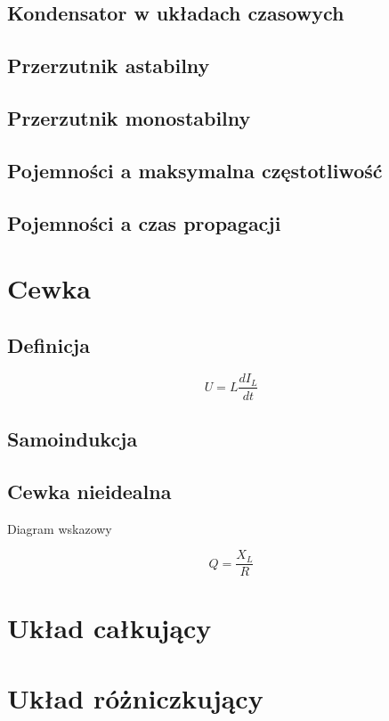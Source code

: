 \documentclass[11pt]{article}
\begin{document}
\subsection{Kondensator w układach czasowych} 

\subsection{Przerzutnik astabilny}

\subsection{Przerzutnik monostabilny}

\subsection{Pojemności a maksymalna częstotliwość}

\subsection{Pojemności a czas propagacji}

\section{Cewka}

\subsection{Definicja}

$$ U = L \frac{dI_L}{dt} $$

\subsection{Samoindukcja}

\subsection{Cewka nieidealna}

Diagram wskazowy

$$ Q = \frac{X_L}{R} $$

\section{Układ całkujący}

\section{Układ różniczkujący}
\end{document}
